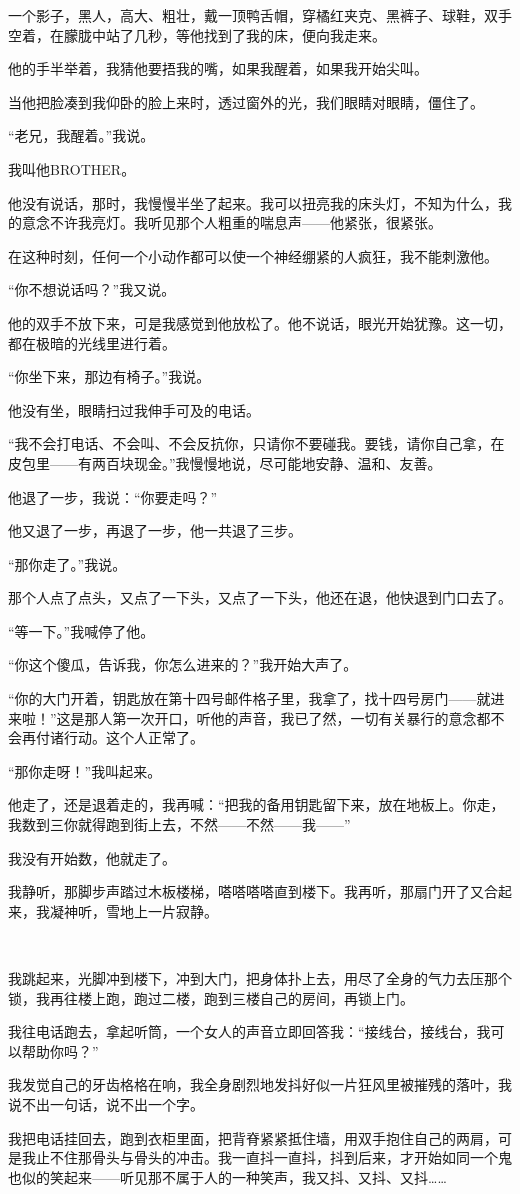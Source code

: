 \par 一个影子，黑人，高大、粗壮，戴一顶鸭舌帽，穿橘红夹克、黑裤子、球鞋，双手空着，在朦胧中站了几秒，等他找到了我的床，便向我走来。
\par 他的手半举着，我猜他要捂我的嘴，如果我醒着，如果我开始尖叫。
\par 当他把脸凑到我仰卧的脸上来时，透过窗外的光，我们眼睛对眼睛，僵住了。
\par “老兄，我醒着。”我说。
\par 我叫他BROTHER。
\par 他没有说话，那时，我慢慢半坐了起来。我可以扭亮我的床头灯，不知为什么，我的意念不许我亮灯。我听见那个人粗重的喘息声——他紧张，很紧张。
\par 在这种时刻，任何一个小动作都可以使一个神经绷紧的人疯狂，我不能刺激他。
\par “你不想说话吗？”我又说。
\par 他的双手不放下来，可是我感觉到他放松了。他不说话，眼光开始犹豫。这一切，都在极暗的光线里进行着。
\par “你坐下来，那边有椅子。”我说。
\par 他没有坐，眼睛扫过我伸手可及的电话。
\par “我不会打电话、不会叫、不会反抗你，只请你不要碰我。要钱，请你自己拿，在皮包里——有两百块现金。”我慢慢地说，尽可能地安静、温和、友善。
\par 他退了一步，我说：“你要走吗？”
\par 他又退了一步，再退了一步，他一共退了三步。
\par “那你走了。”我说。
\par 那个人点了点头，又点了一下头，又点了一下头，他还在退，他快退到门口去了。
\par “等一下。”我喊停了他。
\par “你这个傻瓜，告诉我，你怎么进来的？”我开始大声了。
\par “你的大门开着，钥匙放在第十四号邮件格子里，我拿了，找十四号房门——就进来啦！”这是那人第一次开口，听他的声音，我已了然，一切有关暴行的意念都不会再付诸行动。这个人正常了。
\par “那你走呀！”我叫起来。
\par 他走了，还是退着走的，我再喊：“把我的备用钥匙留下来，放在地板上。你走，我数到三你就得跑到街上去，不然——不然——我——”
\par 我没有开始数，他就走了。
\par 我静听，那脚步声踏过木板楼梯，嗒嗒嗒嗒直到楼下。我再听，那扇门开了又合起来，我凝神听，雪地上一片寂静。
\par  
\par 我跳起来，光脚冲到楼下，冲到大门，把身体扑上去，用尽了全身的气力去压那个锁，我再往楼上跑，跑过二楼，跑到三楼自己的房间，再锁上门。
\par 我往电话跑去，拿起听筒，一个女人的声音立即回答我：“接线台，接线台，我可以帮助你吗？”
\par 我发觉自己的牙齿格格在响，我全身剧烈地发抖好似一片狂风里被摧残的落叶，我说不出一句话，说不出一个字。
\par 我把电话挂回去，跑到衣柜里面，把背脊紧紧抵住墙，用双手抱住自己的两肩，可是我止不住那骨头与骨头的冲击。我一直抖一直抖，抖到后来，才开始如同一个鬼也似的笑起来——听见那不属于人的一种笑声，我又抖、又抖、又抖……





